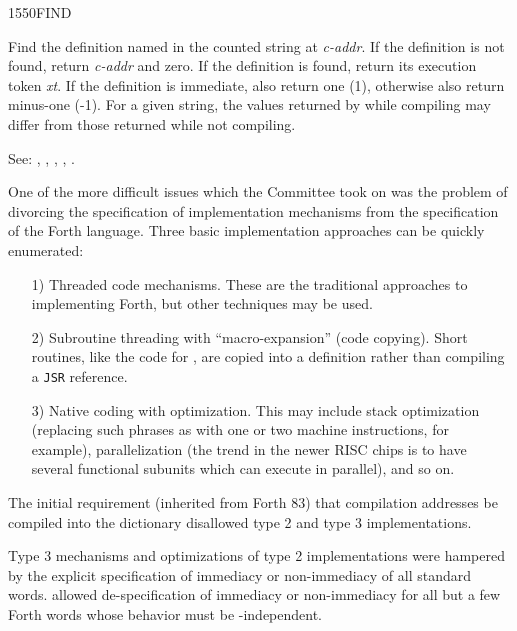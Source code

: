 \begin{newword}{1550}{FIND}

	Find the definition named in the counted string at \emph{c-addr}.
	If the definition is not found, return \emph{c-addr} and zero.
	If the definition is found, return its execution token \emph{xt}.
	If the definition is immediate, also return one (1), otherwise
	also return minus-one (-1). For a given string, the values
	returned by  while compiling may differ from those
	returned while not compiling.

\item[See:]
	,
	,
	,
	,
	.

	\begin{rationale} %
		One of the more difficult issues which the Committee took on
		was the problem of divorcing the specification of
		implementation mechanisms from the specification of the
		Forth language. Three basic implementation approaches can be
		quickly enumerated:

		\begin{enumerate}
		\item[1)] Threaded code mechanisms.
			These are the traditional approaches to implementing Forth,
			but other techniques may be used.

		\item[2)] Subroutine threading with ``macro-expansion'' (code
			copying). Short routines, like the code for ,
			are copied into a definition rather than compiling a
			\texttt{JSR} reference.

		\item[3)] Native coding with optimization.
			This may include stack optimization (replacing such phrases
			as   \word{+} with one or two machine
			instructions, for example), parallelization (the trend in
			the newer RISC chips is to have several functional subunits
			which can execute in parallel), and so on.
		\end{enumerate}

		The initial requirement (inherited from Forth 83) that
		compilation addresses be compiled into the dictionary
		disallowed type 2 and type 3 implementations.

		Type 3 mechanisms and optimizations of type 2 implementations
		were hampered by the explicit specification of immediacy or
		non-immediacy of all standard words.  allowed
		de-specification of immediacy or non-immediacy for all but a
		few Forth words whose behavior must be -independent.


\end{rationale}
\end{newword}
